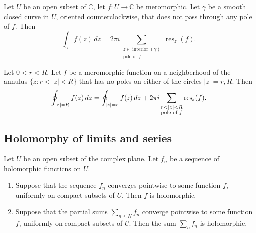\documentclass[reqno]{amsart}  \numberwithin{theorem}{section} \numberwithin{equation}{section}
\begin{document}
\begin{theorem}\label{theorem:cj3wnb89dd}
  Let $U$ be an open subset of $\mathbb{C}$, let $f : U \rightarrow \mathbb{C} $ be meromorphic.  Let $\gamma$ be a smooth closed curve in $U$, oriented counterclockwise, that does not pass through any pole of $f$.  Then
  \begin{equation*}
    \int_\gamma f(z) \, d z = 2 \pi i \sum_{\substack{z \in \operatorname{interior}(\gamma) \\ \text{pole of $f$}}} \operatorname{res}_z(f).
  \end{equation*}
\end{theorem}
\begin{remark}
  Let $0 < r < R$.  Let $f$ be a meromorphic function on a neighborhood of the annulus $\{z : r < |z| < R\}$ that has no poles on either of the circles $|z| = r, R$.  Then
  \begin{equation*}
    \oint_{|z| = R} f(z) \, d z
    =
    \oint_{|z| = r} f(z) \, d z
    + 2 \pi i \sum_{
      \substack{
        r < |z| < R 
        \\
        \text{pole of $f$}
      }
    }
    \operatorname{res}_z(f).
  \end{equation*}
\end{remark}

\subsection{Holomorphy of limits and series}
\begin{theorem}\label{theorem:cj3vqa91ti}
  Let $U$ be an open subset of the complex plane.  Let $f_n$ be a sequence of holomorphic functions on $U$.
  \begin{enumerate}
  \item Suppose that the sequence $f_n$ converges pointwise to some function $f$, uniformly on compact subsets of $U$.  Then $f$ is holomorphic.
  \item Suppose that the partial sums $\sum_{n \leq N} f_n$ converge pointwise to some function $f$, uniformly on compact subsets of $U$.  Then the sum $\sum_n f_n$ is holomorphic.
  \end{enumerate}
\end{theorem}

\newpage
\end{document}
